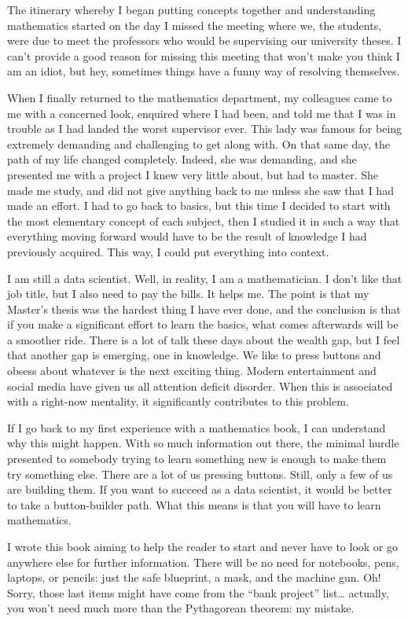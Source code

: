 \documentclass[a4,12pt,twosided,openany]{memoir}
\begin{document}
\par 
\indent
The itinerary whereby I began putting concepts together and understanding mathematics started on the day I missed the meeting where we, the students, were due to meet the professors who would be supervising our university theses. I can’t provide a good reason for missing this meeting that won’t make you think I am an idiot, but hey, sometimes things have a funny way of resolving themselves. 
\par 
\indent
When I finally returned to the mathematics department, my colleagues came to me with a concerned look, enquired where I had been, and told me that I was in trouble as I had landed the worst supervisor ever. This lady was famous for being extremely demanding and challenging to get along with. On that same day, the path of my life changed completely. Indeed, she was demanding, and she presented me with a project I knew very little about, but had to master. She made me study, and did not give anything back to me unless she saw that I had made an effort. I had to go back to basics, but this time I decided to start with the most elementary concept of each subject, then I studied it in such a way that everything moving forward would have to be the result of knowledge I had previously acquired. This way, I could put everything into context.
\par 
\indent
I am still a data scientist. Well, in reality, I am a mathematician. I don’t like that job title, but I also need to pay the bills. It helps me. The point is that my Master’s thesis was the hardest thing I have ever done, and the conclusion is that if you make a significant effort to learn the basics, what comes afterwards will be a smoother ride. There is a lot of talk these days about the wealth gap, but I feel that another gap is emerging, one in knowledge. We like to press buttons and obsess about whatever is the next exciting thing. Modern entertainment and social media have given us all attention deficit disorder. When this is associated with a right-now mentality, it significantly contributes to this problem. 
\par 
\indent
If I go back to my first experience with a mathematics book, I can understand why this might happen. With so much information out there, the minimal hurdle presented to somebody trying to learn something new is enough to make them try something else. There are a lot of us pressing buttons. Still, only a few of us are building them. If you want to succeed as a data scientist, it would be better to take a button-builder path. What this means is that you will have to learn mathematics. 
\par 
\indent
I wrote this book aiming to help the reader to start and never have to look or go anywhere else for further information. There will be no need for notebooks, pens, laptops, or pencils: just the safe blueprint, a mask, and the machine gun. Oh! Sorry, those last items might have come from the “bank project” list… actually, you won’t need much more than the Pythagorean theorem: my mistake.
\end{document}
